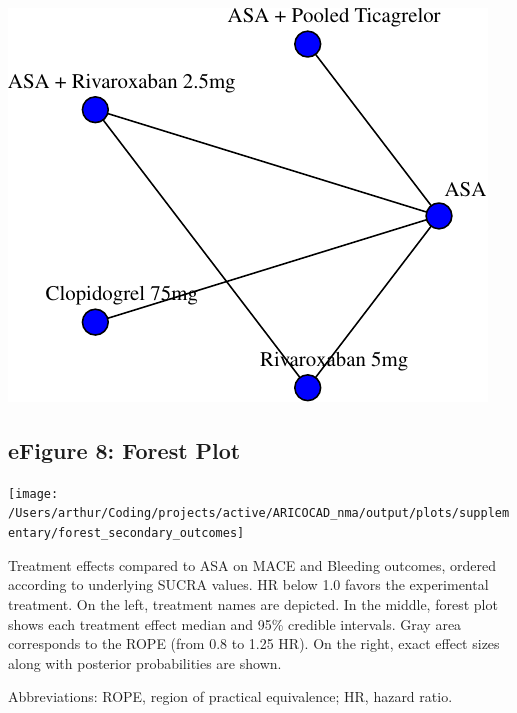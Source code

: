\documentclass[
  12pt,
]{article}
\begin{document}
\begin{center}\includegraphics{03_supplementary_files/figure-latex/unnamed-chunk-32-1} \end{center}

\newpage

\hypertarget{efigure-8-forest-plot}{%
\subsection{eFigure 8: Forest Plot}\label{efigure-8-forest-plot}}

\begin{center}\texttt{[image: /Users/arthur/Coding/projects/active/ARICOCAD\_nma/output/plots/supplementary/forest\_secondary\_outcomes]} \end{center}

Treatment effects compared to ASA on MACE and Bleeding outcomes, ordered
according to underlying SUCRA values. HR below 1.0 favors the
experimental treatment. On the left, treatment names are depicted. In
the middle, forest plot shows each treatment effect median and 95\%
credible intervals. Gray area corresponds to the ROPE (from 0.8 to 1.25
HR). On the right, exact effect sizes along with posterior probabilities
are shown.

Abbreviations: ROPE, region of practical equivalence; HR, hazard ratio.

\newpage
\end{document}
